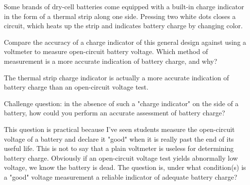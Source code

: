 

Some brands of dry-cell batteries come equipped with a built-in charge indicator in the form of a thermal strip along one side.  Pressing two white dots closes a circuit, which heats up the strip and indicates battery charge by changing color.

Compare the accuracy of a charge indicator of this general design against using a voltmeter to measure open-circuit battery voltage.  Which method of measurement is a more accurate indication of battery charge, and why?







The thermal strip charge indicator is actually a more accurate indication of battery charge than an open-circuit voltage test.

\vskip 10pt

Challenge question: in the absence of such a "charge indicator" on the side of a battery, how could you perform an accurate assessment of battery charge?







This question is practical because I've seen students measure the open-circuit voltage of a battery and declare it "good" when it is really past the end of its useful life.  This is not to say that a plain voltmeter is useless for determining battery charge.  Obviously if an open-circuit voltage test yields abnormally low voltage, we know the battery is dead.  The question is, under what condition(s) is a "good" voltage measurement a reliable indicator of adequate battery charge?




